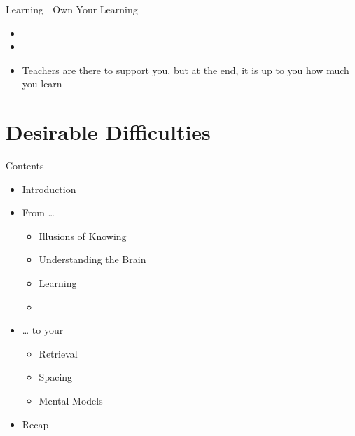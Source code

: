 \documentclass{ercisbeamer}
\begin{document}
\begin{frame}{Learning | Own Your Learning}
    \begin{tbox}
        \begin{itemize}
            \item {}
            \item {}
            \item Teachers are there to support you, but at the end, it is up to you how much you learn
        \end{itemize}
    \end{tbox}
\end{frame}
\setbgimage{}

\section{Desirable Difficulties}
\begin{frame}{Contents}
    \begin{itemize}
        \item Introduction
        \item From …
        \begin{itemize}
            \item Illusions of Knowing
            \item Understanding the Brain
            \item Learning
            \item {}
        \end{itemize}
        \item … to your 
        \begin{itemize}
            \item Retrieval
            \item Spacing
            \item Mental Models
        \end{itemize}
        \item Recap
    \end{itemize}
\end{frame}
\end{document}
